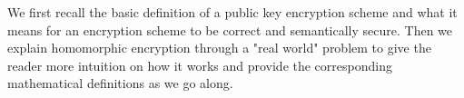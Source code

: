 \documentclass[../../main.tex]{subfiles}
\begin{document}
We first recall the basic definition of a public key encryption scheme and what it means for an encryption scheme to be correct and semantically secure. Then we explain homomorphic encryption through a "real world" problem to give the reader more intuition on how it works and provide the corresponding mathematical definitions as we go along.
\end{document}

